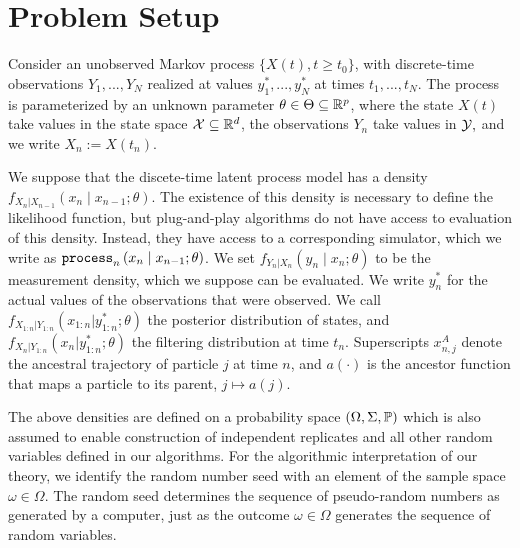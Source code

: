 \documentclass[11pt]{article}
\begin{document}
\section{Problem Setup}

Consider an unobserved Markov process $\{X(t),t  \geq t_0\}$, with discrete-time observations $Y_1,...,Y_N$ realized at values $y_1^*,...,y_N^*$ at times $t_1,..., t_N$.
The process is parameterized by an unknown parameter $\theta \in \Theta \subseteq \mathbb{R}^p$, where the state $X(t)$ take values in the state space ${\mathcal{X}} \subseteq \mathbb{R}^d$, the observations $Y_n$ take values in ${\mathcal{Y}},$ and we write $X_n := X(t_n)$. 


We suppose that the discete-time latent process model has a density $f_{X_n|X_{n-1}}\left(x_{n} \mid x_{n-1}; \theta\right)$.
The existence of this density is necessary to define the likelihood function, but plug-and-play algorithms do not have access to evaluation of this density.
Instead, they have access to a corresponding simulator, which we write as $\texttt{process}_n\left(x_n\mid x_{n-1}; \theta\right)$.
We set $f_{Y_n|X_n}\left(y_n \mid x_n; \theta\right)$ to be the measurement density, which we suppose can be evaluated. We write $y_n^*$ for the actual values of the observations that were observed.
We call $f_{X_{1:n}|Y_{1:n}}(x_{1:n}|y_{1:n}^*; \theta)$ the posterior distribution of states, and $f_{X_{n}|Y_{1:n}}(x_n|y_{1:n}^*; \theta)$ the filtering distribution at time $t_n$.
Superscripts $x_{n,j}^A$ denote the ancestral trajectory of particle $j$ at time $n$, and $a(\cdot)$ is the ancestor function that maps a particle to its parent, $j \mapsto a(j)$.

The above densities are defined on a probability space $(\Omega, \Sigma, \mathbb{P})$ which is also assumed to enable construction of independent replicates and all other random variables defined in our algorithms.
For the algorithmic interpretation of our theory, we identify the random number seed with an element of the sample space $\omega \in \Omega$. The random seed determines the sequence of pseudo-random numbers as generated by a computer, just as the outcome $\omega\in\Omega$ generates the sequence of random variables.
\end{document}

